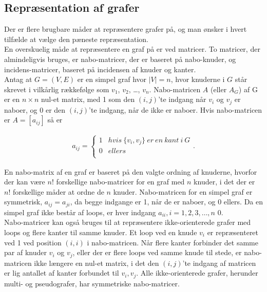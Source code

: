 \subsection{Repræsentation af grafer}

Der er flere brugbare måder at repræsentere grafer på, og man ønsker i hvert tilfælde at vælge den pæneste repræsentation. \\
En overskuelig måde at repræsentere en graf på er ved matricer. To matricer, der almindeligvis bruges, er nabo-matricer, der er baseret på nabo-knuder, og incidens-matricer, baseret på incidensen af knuder og kanter. \\
Antag at $G=(V,E)$ er en simpel graf hvor $|V|=n$, hvor knuderne i $G$ står skrevet i vilkårlig rækkefølge som $v_1$, $v_2$, \dots , $v_n$. Nabo-matricen $A$ (eller $A_G$) af G er en $n \times n$ nul-et matrix, med 1 som den $(i,j)$’te indgang når $v_i$ og $v_j$ er naboer, og 0 er den $(i,j)$’te indgang, når de ikke er naboer. Hvis nabo-matricen er $A=[a_{ij}]$ så er

\begin{align*}
a_{ij}= \left\{\begin{array}{cc}
1 & hvis \  \lbrace v_i, v_j \rbrace \  er \  en \  kant \  i \  G \\
0 & ellers \\
\end{array}\right.
.
\end{align*}

En nabo-matrix af en graf er baseret på den valgte ordning af knuderne, hvorfor der kan være $n!$ forskellige nabo-matricer for en graf med $n$ knuder, i det der er $n!$ forskellige måder at ordne de $n$ knuder. Nabo-matricen for en simpel graf er symmetrisk, $a_{ij}=a_{ji}$, da begge indgange er 1, når de er naboer, og 0 ellers. Da en simpel graf ikke består af loops, er hver indgang $a_{ii},i=1,2,3, \dots ,n$ $0$. \\
Nabo-matricer kan også bruges til at repræsentere ikke-orienterede grafer med loops og flere kanter til samme knuder. Et loop ved en knude $v_i$ er repræsenteret ved 1 ved position $(i,i)$ i nabo-matricen. Når flere kanter forbinder det samme par af knuder $v_i$ og $v_j$, eller der er flere loops ved samme knude til stede, er nabo-matricen ikke længere en nul-et matrix, i det den $(i,j)$’te indgang af matricen er lig antallet af kanter forbundet til ${v_i,v_j}$. Alle ikke-orienterede grafer, herunder multi- og pseudografer, har symmetriske nabo-matricer. 

